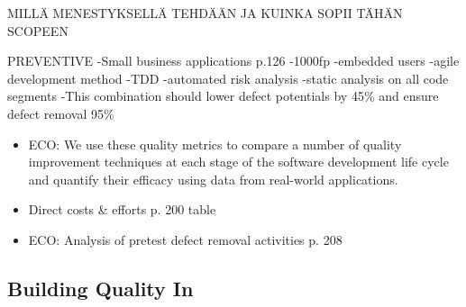
MILLÄ MENESTYKSELLÄ TEHDÄÄN JA KUINKA SOPII TÄHÄN SCOPEEN



PREVENTIVE
-Small business applications p.126
	-1000fp
	-embedded users
	-agile development method
	-TDD
	-automated risk analysis
	-static analysis on all code segments
	-This combination should lower defect potentials by 45\% and ensure defect removal 95\%




 \begin{itemize}
  
 \item ECO: We use these quality metrics to compare a number of quality improvement techniques at each stage of the software development life cycle and quantify their efficacy using data from real-world applications.
 
 \item Direct costs \& efforts p. 200 table

 \item ECO: Analysis of pretest defect removal activities p. 208

 \end{itemize}
 
 \subsection{Building Quality In}





